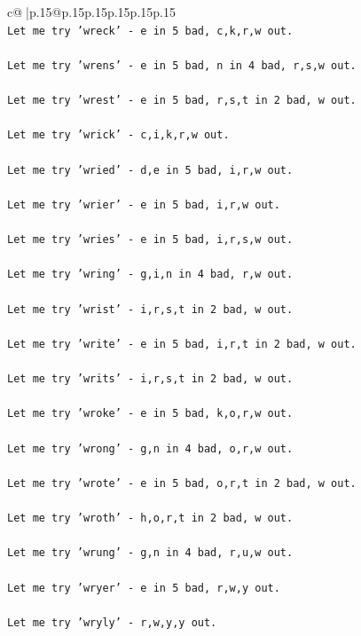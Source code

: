 \documentclass{article}
\begin{document}
{\begin{supertabular}{c@{$\;$}|p{.15\linewidth}@{}p{.15\linewidth}p{.15\linewidth}p{.15\linewidth}p{.15\linewidth}p{.15\linewidth}}
{{{\\ 
\texttt{Let me try 'wreck' {-} e in 5 bad, c,k,r,w out. } \\
\\ 
\texttt{Let me try 'wrens' {-} e in 5 bad, n in 4 bad, r,s,w out. } \\
\\ 
\texttt{Let me try 'wrest' {-} e in 5 bad, r,s,t in 2 bad, w out. } \\
\\ 
\texttt{Let me try 'wrick' {-} c,i,k,r,w out. } \\
\\ 
\texttt{Let me try 'wried' {-} d,e in 5 bad, i,r,w out. } \\
\\ 
\texttt{Let me try 'wrier' {-} e in 5 bad, i,r,w out. } \\
\\ 
\texttt{Let me try 'wries' {-} e in 5 bad, i,r,s,w out. } \\
\\ 
\texttt{Let me try 'wring' {-} g,i,n in 4 bad, r,w out. } \\
\\ 
\texttt{Let me try 'wrist' {-} i,r,s,t in 2 bad, w out. } \\
\\ 
\texttt{Let me try 'write' {-} e in 5 bad, i,r,t in 2 bad, w out. } \\
\\ 
\texttt{Let me try 'writs' {-} i,r,s,t in 2 bad, w out. } \\
\\ 
\texttt{Let me try 'wroke' {-} e in 5 bad, k,o,r,w out. } \\
\\ 
\texttt{Let me try 'wrong' {-} g,n in 4 bad, o,r,w out. } \\
\\ 
\texttt{Let me try 'wrote' {-} e in 5 bad, o,r,t in 2 bad, w out. } \\
\\ 
\texttt{Let me try 'wroth' {-} h,o,r,t in 2 bad, w out. } \\
\\ 
\texttt{Let me try 'wrung' {-} g,n in 4 bad, r,u,w out. } \\
\\ 
\texttt{Let me try 'wryer' {-} e in 5 bad, r,w,y out. } \\
\\ 
\texttt{Let me try 'wryly' {-} r,w,y,y out. } \\
}}}
\end{supertabular}}
\end{document}
